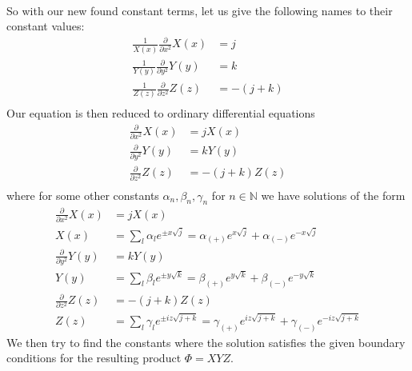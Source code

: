 \documentclass{article}
\begin{document}
\paragraph{}
So with our new found constant terms, let us give the following names to their constant values:
\begin{align*}
\frac{1}{X(x)}\frac{\partial}{\partial x^{2}}X(x) &= j\\
\frac{1}{Y(y)}\frac{\partial}{\partial y^{2}}Y(y) &= k\\
\frac{1}{Z(z)}\frac{\partial}{\partial z^{2}}Z(z) &= -(j+k)\\
\end{align*}
Our equation is then reduced to ordinary differential equations
\begin{align*}
\frac{\partial}{\partial x^{2}}X(x) &= j X(x)\\
\frac{\partial}{\partial y^{2}}Y(y) &= k Y(y)\\
\frac{\partial}{\partial z^{2}}Z(z) &= -(j+k) Z(z)\\
\end{align*}
where for some other constants $\alpha_{n},\beta_{n},\gamma_{n}$ for $n\in\mathbb{N}$ we have solutions of the form
\begin{align*}
\frac{\partial}{\partial x^{2}}X(x) &= j X(x)\\
X(x) &= \sum_{l}\alpha_{l}e^{\pm x\sqrt{j}} = \alpha_{(+)}e^{x\sqrt{j}}+\alpha_{(-)}e^{-x\sqrt{j}}\\
\frac{\partial}{\partial y^{2}}Y(y) &= k Y(y)\\
Y(y) &= \sum_{l}\beta_{l}e^{\pm y\sqrt{k}} = \beta_{(+)}e^{y\sqrt{k}}+\beta_{(-)}e^{-y\sqrt{k}}\\
\frac{\partial}{\partial z^{2}}Z(z) &= -(j+k) Z(z)\\
Z(z) &= \sum_{l}\gamma_{l}e^{\pm iz\sqrt{j+k}} = \gamma_{(+)}e^{iz\sqrt{j+k}}+\gamma_{(-)}e^{-iz\sqrt{j+k}}
\end{align*}
We then try to find the constants where the solution satisfies the given boundary conditions for the resulting product $\Phi=XYZ$.
\end{document}

